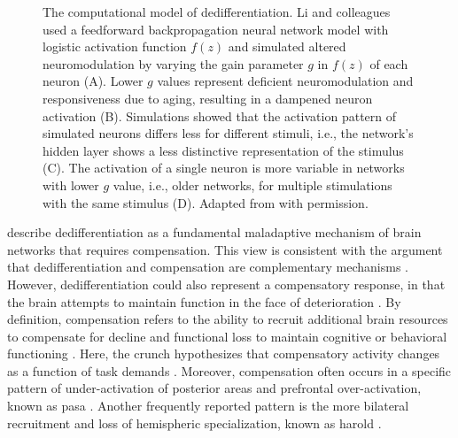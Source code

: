 \begin{figure}[h]
\def\svgwidth{\columnwidth}

\captionsetup{justification=justified}
\caption[The computational model of dedifferentiation.]{The computational model of dedifferentiation. Li and colleagues \cite{Li2001,Li2002} used a feedforward backpropagation neural network model with logistic activation function $f(z)$ and simulated altered neuromodulation by varying the gain parameter $g$ in $f(z)$ of each neuron (A). Lower $g$ values represent deficient neuromodulation and responsiveness due to aging, resulting in a dampened neuron activation (B). Simulations showed that the activation pattern of simulated neurons differs less for different stimuli, i.e., the network's hidden layer shows a less distinctive representation of the stimulus (C). The activation of a single neuron is more variable in networks with lower $g$ value, i.e., older networks, for multiple stimulations with the same stimulus (D). Adapted from \citeauthor{Li2001} \cite{Li2001} with permission.}
\label{fig:dedifferentiation}
\end{figure}

\noindent  \citeauthor{Fornito2015} \cite{Fornito2015} describe dedifferentiation as a fundamental maladaptive mechanism of brain networks that requires compensation. This view is consistent with the argument that dedifferentiation and compensation are complementary mechanisms \cite{Reuter-Lorenz2010}. However, dedifferentiation could also represent a compensatory response, in that the brain attempts to maintain function in the face of deterioration \cite{Stern2009}. By definition, compensation refers to the ability to recruit additional brain resources to compensate for decline and functional loss to maintain cognitive or behavioral functioning \cite{Reuter-Lorenz2010, Grady2012}. Here, the \gls{crunch} hypothesizes that compensatory activity changes as a function of task demands \cite{Festini2018}. Moreover, compensation often occurs in a specific pattern of under-activation of posterior areas and prefrontal over-activation, known as \gls{pasa} \cite{Davis2007}. Another frequently reported pattern is the more bilateral recruitment and loss of hemispheric specialization, known as \gls{harold} \cite{Cabeza2002}.

